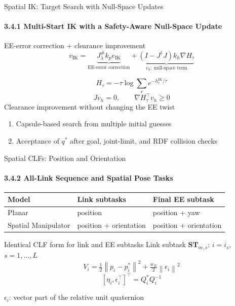 \documentclass[t,10pt,handout]{beamer}
\newcommand{\ee}{\mathrm{ee}}
\newcommand{\subtask}[1]{\mathbf{ST}_{\ee,#1}}
\newcommand{\norm}[1]{\left\lVert#1\right\rVert}
\newenvironment{slidebody}{\begin{minipage}[t][68.5mm][s]{\linewidth}\vspace{0pt}}{\par\vspace{0pt}\end{minipage}}
\begin{document}
\begin{frame}[label=panda-ik]{Spatial IK: Target Search with Null-Space Updates}
  \framesubtitle{3.4.1 Multi-Start IK with a Safety-Aware Null-Space Update}
  \begin{slidebody}
    \setlength{\abovedisplayskip}{3pt}
    \setlength{\belowdisplayskip}{3pt}

    \begin{block}{EE-error correction + clearance improvement~\cite{siciliano2009robotics}}
      \[v_{\mathrm{IK}}=
        \underbrace{J_\lambda^\# k_pe_{\mathrm{IK}}}_{\text{EE-error correction}}
        +\underbrace{(I-J^\dagger J)k_h\nabla H_\tau}_{v_h:\ \text{null-space term}}\]
    \end{block}
    \vfill
    \[H_\tau=-\tau\log\sum_r e^{-h_r^{\mathrm{IK}}/\tau}\]
    \[Jv_h=0,\qquad \nabla H_\tau^\top v_h\geq0\]
    \centering Clearance improvement without changing the EE twist\par
    \vfill
    \begin{enumerate}\setlength{\itemsep}{3mm}
      \item Capsule-based search from multiple initial guesses
      \item Acceptance of $q^*$ after goal, joint-limit, and RDF collision checks
    \end{enumerate}

  \end{slidebody}
\end{frame}

\begin{frame}[label=panda-clf]{Spatial CLFs: Position and Orientation}
  \framesubtitle{3.4.2 All-Link Sequence and Spatial Pose Tasks}
  \begin{slidebody}

    \begin{tabularx}{\linewidth}{@{}lXX@{}}\toprule
      Model               & Link subtasks          & Final EE subtask       \\\midrule
      Planar              & position               & position + yaw         \\[3mm]
      Spatial Manipulator & position + orientation & position + orientation \\\bottomrule
    \end{tabularx}
    \vfill
    \begin{block}{Identical CLF form for link and EE subtasks}
      \centering Link subtask $\subtask{s}$: $i=i_s$, $s=1,\ldots,L$
      \[V_i=\tfrac12\norm{p_i-p_i^*}^2+
        \tfrac{w_R}{2}\norm{\epsilon_i}^2\]
      \[[\eta_i,\epsilon_i^\top]^\top=Q_i^*Q_i^{-1}\]
    \end{block}
    \vfill
    \centering
    $\epsilon_i$: vector part of the relative unit quaternion\par
    \vspace*{6mm}
  \end{slidebody}
\end{frame}
\end{document}
